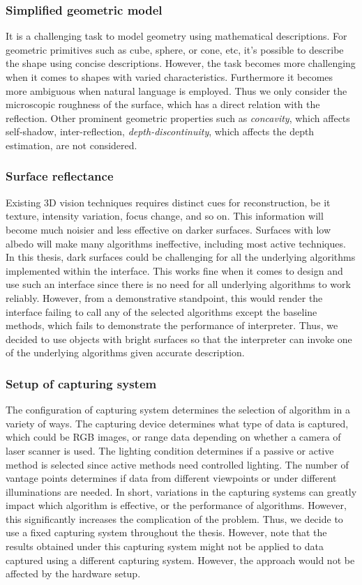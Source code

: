 \subsubsection{Simplified geometric model}
It is a challenging task to model geometry using mathematical descriptions. For geometric primitives such as cube, sphere, or cone, etc, it's possible to describe the shape using concise descriptions. However, the task becomes more challenging when it comes to shapes with varied characteristics. Furthermore it becomes more ambiguous when natural language is employed. Thus we only consider the microscopic roughness of the surface, which has a direct relation with the reflection. Other prominent geometric properties such as \textit{concavity}, which affects self-shadow, inter-reflection, \textit{depth-discontinuity}, which affects the depth estimation, are not considered.

\subsubsection{Surface reflectance}
Existing 3D vision techniques requires distinct cues for reconstruction, be it texture, intensity variation, focus change, and so on. This information will become much noisier and less effective on darker surfaces. Surfaces with low albedo will make many algorithms ineffective, including most active techniques. In this thesis, dark surfaces could be challenging for all the underlying algorithms implemented within the interface. This works fine when it comes to design and use such an interface since there is no need for all underlying algorithms to work reliably. However, from a demonstrative standpoint, this would render the interface failing to call any of the selected algorithms except the baseline methods, which fails to demonstrate the performance of interpreter. Thus, we decided to use objects with bright surfaces so that the interpreter can invoke one of the underlying algorithms given accurate description.

\subsubsection{Setup of capturing system}
The configuration of capturing system determines the selection of algorithm in a variety of ways. The capturing device determines what type of data is captured, which could be RGB images, or range data depending on whether a camera of laser scanner is used. The lighting condition determines if a passive or active method is selected since active methods need controlled lighting. The number of vantage points determines if data from different viewpoints or under different illuminations are needed. In short, variations in the capturing systems can greatly impact which algorithm is effective, or the performance of algorithms. However, this significantly increases the complication of the problem. Thus, we decide to use a fixed capturing system throughout the thesis. However, note that the results obtained under this capturing system might not be applied to data captured using a different capturing system. However, the approach would not be affected by the hardware setup.

